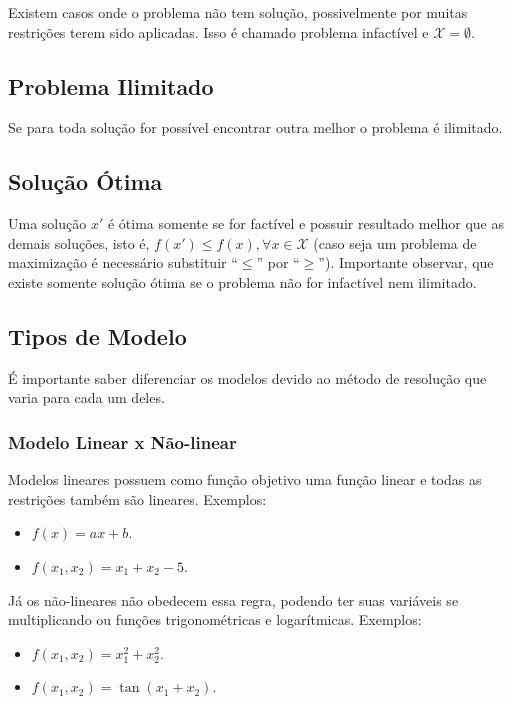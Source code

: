 Existem casos onde o problema não tem solução, possivelmente por muitas restrições terem sido aplicadas.
Isso é chamado problema infactível e $\mathcal{X} = \emptyset$.

\subsection{Problema Ilimitado}\label{subsec:problema-ilimitado}

Se para toda solução for possível encontrar outra melhor o problema é ilimitado.

\subsection{Solução Ótima}\label{subsec:solucao-otima}

Uma solução $x'$ é ótima somente se for factível e possuir resultado melhor que as demais soluções, isto é, $f(x') \le f(x), \forall x \in \mathcal{X}$ (caso seja um problema de maximização é necessário substituir “$\le$” por “$\ge$”).
Importante observar, que existe somente solução ótima se o problema não for infactível nem ilimitado.

\subsection{Tipos de Modelo}\label{subsec:tipos-de-modelo}

É importante saber diferenciar os modelos devido ao método de resolução que varia para cada um deles.

\subsubsection{Modelo Linear x Não-linear}\label{subsubsec:modelo-linear}


Modelos lineares possuem como função objetivo uma função linear e todas as restrições também são lineares.
Exemplos:

\begin{itemize}
    \item $f(x) = ax + b$.
    \item $f(x_1, x_2) = x_1 + x_2 - 5$.
\end{itemize}

Já os não-lineares não obedecem essa regra, podendo ter suas variáveis se multiplicando ou funções trigonométricas e logarítmicas.
Exemplos:

\begin{itemize}
    \item $f(x_1, x_2) = x_1^2 + x_2^2$.
    \item $f(x_1, x_2) = \tan(x_1 + x_2)$.
\end{itemize}

